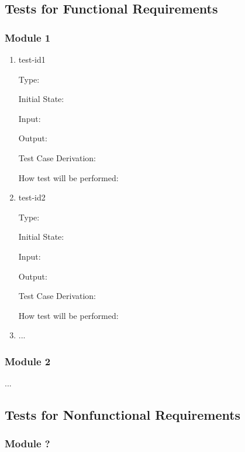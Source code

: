 \documentclass[12pt, titlepage]{article}
\begin{document}
\subsection{Tests for Functional Requirements}



\subsubsection{Module 1}


\begin{enumerate}

\item{test-id1\\}

Type: 

					
Initial State: 
					
Input: 
					
Output: 

Test Case Derivation: 

How test will be performed: 
					
\item{test-id2\\}

Type: 
					
Initial State: 
					
Input: 
					
Output: 

Test Case Derivation: 

How test will be performed: 

\item{...\\}
    
\end{enumerate}

\subsubsection{Module 2}

...

\subsection{Tests for Nonfunctional Requirements}





\subsubsection{Module ?}
		
\end{document}

